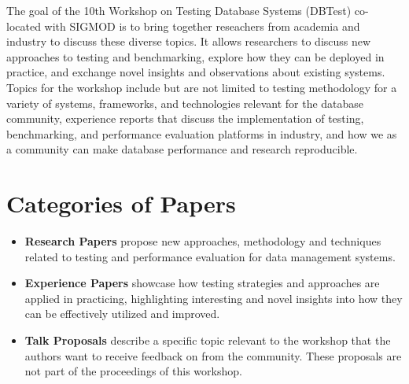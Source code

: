 \documentclass[sigconf]{acmart}
\begin{document}
The goal of the 10th Workshop on Testing Database Systems (DBTest) co-located with SIGMOD is to bring together reseachers from academia and industry to discuss these diverse topics.
It allows researchers to discuss new approaches to testing and benchmarking, explore how they can be deployed in practice, and exchange novel insights and observations about existing systems.
Topics for the workshop include but are not limited to testing methodology for a variety of systems, frameworks, and technologies relevant for the database community, experience reports that discuss the implementation of testing, benchmarking, and performance evaluation platforms in industry, and how we as a community can make database performance and research reproducible.

\section{Categories of Papers}
\begin{itemize}
    \item {\bf Research Papers} propose new approaches, methodology and techniques related to testing and performance evaluation for data management systems.
    \item {\bf Experience Papers} showcase how testing strategies and approaches are applied in practicing, highlighting interesting and novel insights into how they can be effectively utilized and improved.
    \item {\bf Talk Proposals} describe a specific topic relevant to the workshop that the authors want to receive feedback on from the community. These proposals are not part of the proceedings of this workshop.
\end{itemize}
\end{document}
